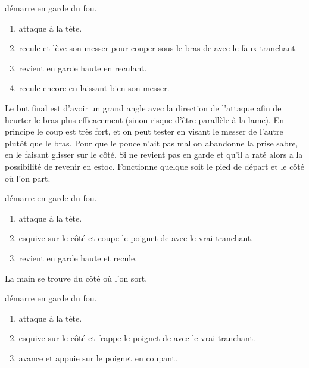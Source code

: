 \begin{technique}

\D démarre en garde du fou.

\begin{enumerate}
	\item \A attaque à la tête.
	\item \D recule et lève son messer pour couper sous le bras de \A avec le faux tranchant.
	\item \D revient en garde haute en reculant.
	\item \D recule encore en laissant bien son messer.
\end{enumerate}

Le but final est d'avoir un grand angle avec la direction de l'attaque afin de heurter le bras plus efficacement (sinon risque d'être parallèle à la lame).
En principe le coup est très fort, et on peut tester en visant le messer de l'autre plutôt que le bras. Pour que le pouce n'ait pas mal on abandonne la prise sabre, en le faisant glisser sur le côté.
Si \D ne revient pas en garde et qu'il a raté alors \A a la possibilité de revenir en estoc.
Fonctionne quelque soit le pied de départ et le côté où l'on part.

\end{technique}


\begin{technique}

\D démarre en garde du fou.

\begin{enumerate}
	\item \A attaque à la tête.
	\item \D esquive sur le côté et coupe le poignet de \A avec le vrai tranchant.
	\item \D revient en garde haute et recule.
\end{enumerate}

La main se trouve du côté où l'on sort.

\end{technique}


\begin{technique}

\D démarre en garde du fou.

\begin{enumerate}
	\item \A attaque à la tête.
	\item \D esquive sur le côté et frappe le poignet de \A avec le vrai tranchant.
	\item \D avance et appuie sur le poignet en coupant.
\end{enumerate}

\end{technique}


